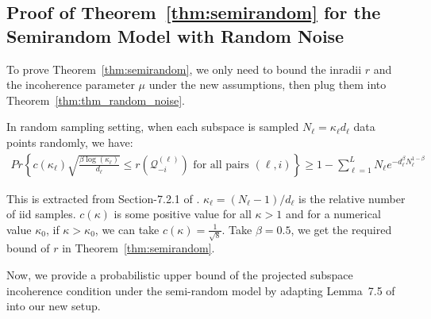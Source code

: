 \documentclass[twoside,11pt]{article}
\numberwithin{equation}{section}
\begin{document}
\subsection{Proof of Theorem~\ref{thm:semirandom}  for the Semirandom Model with Random Noise}
To prove Theorem~\ref{thm:semirandom}, we only need to bound the inradii $r$ and the incoherence parameter $\mu$ under the new assumptions, then plug them into Theorem~\ref{thm:thm_random_noise}.

\begin{lemma}\label{lemma:random_inradius}
  In random sampling setting, when each subspace is sampled $N_{\ell}=\kappa_{\ell} d_{\ell}$ data points randomly, we have:
  \begin{align*}
    Pr\left\{c(\kappa_{\ell})\sqrt{\frac{
    \beta\log{(\kappa_{\ell})}}{ d_{\ell}}}\leq r(\mathcal{Q}^{(\ell)}_{-i})\text{ for all pairs }(\ell,i)\right\}
    \geq 1-\sum_{\ell=1}^{L}N_{\ell}e^{-d_{\ell}^{\beta}N_{\ell}^{1-\beta}}
  \end{align*}
\end{lemma}
This is extracted from Section-7.2.1 of \citet{soltanolkotabi2011geometric}. $\kappa_{\ell}=(N_{\ell}-1)/{d_\ell}$ is the relative number of iid samples. $c(\kappa)$ is some positive value for all $\kappa>1$ and for a numerical value $\kappa_0$, if $\kappa>\kappa_0$, we can take $c(\kappa)=\frac{1}{\sqrt{8}}$. Take $\beta=0.5$, we get the required bound of $r$ in Theorem~\ref{thm:semirandom}.


Now, we   provide a probabilistic upper bound of the projected subspace incoherence condition under the semi-random model by adapting Lemma~7.5 of \citet{soltanolkotabi2011geometric} into our new setup.
\end{document}

